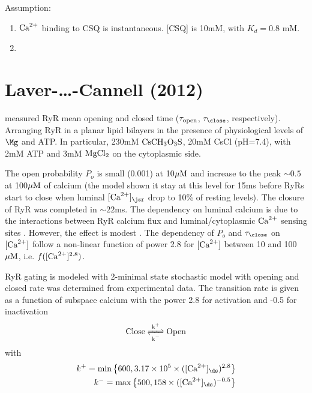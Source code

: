 Assumption:
\begin{enumerate}
  \item ${\text{Ca}^{2+}}$ binding to CSQ is instantaneous. [CSQ] is 10mM, with $K_d = 0.8$
  mM.
  \item
\end{enumerate}

\section{Laver-\ldots-Cannell (2012)}
\label{sec:RyR_Laver2012}

\citep{laver2012} measured RyR mean opening and closed time ($\tau_{\text{open}}$,
$\tau_\close$, respectively). Arranging RyR in a planar lipid bilayers in the
presence of physiological levels of $\Mg$ and ATP. In particular, 230mM
$\ce{CsCH3O3S}$, 20mM CsCl (pH=7.4), with 2mM ATP and 3mM $\ce{MgCl2}$ on the
cytoplasmic side.

The open probability $P_o$ is small (0.001) at 10${\mu\text{M}}$ and increase to the peak
$\sim 0.5$ at 100${\mu\text{M}}$ of calcium (the model shown it stay at this level for
15ms before RyRs start to close when luminal $[\Ca]_\jsr$ drop to 10\% of
resting levels).
The closure of RyR was completed in $\sim 22$ms.  The dependency on luminal
calcium is due to the interactions between RyR calcium flux and
luminal/cytoplasmic ${\text{Ca}^{2+}}$ sensing sites \citep{laver2008}.
However, the effect is modest \citep{laver2007}.
The dependency of $P_o$ and $\tau_\close$ on $[{\text{Ca}^{2+}}]$ follow a non-linear
function of power 2.8 for $[{\text{Ca}^{2+}}]$ between 10 and 100${\mu\text{M}}$, i.e.
$f([{\text{Ca}^{2+}}]^{2.8})$.

RyR gating is modeled with 2-minimal state stochastic model with opening and
closed rate was determined from experimental data. The transition rate is given
as a function of subspace calcium with the power 2.8 for activation and -0.5 for
inactivation
\begin{equation}
\ce{\text{Close} <=>[k^+][k^-] \text{Open}}
\end{equation}
with
\begin{equation}
\begin{split}
k^+ = \min\left\{ 600, 3.17\times 10^5 \times ([\Ca]_\ds)^{2.8} \right\} \\
k^- = \max\left\{ 500, 158 \times ([\Ca]_\ds)^{-0.5} \right\}
\end{split}
\end{equation}


